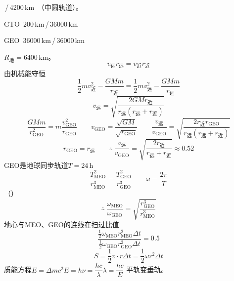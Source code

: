 
\,/\,4200\,km\ （中圆轨道）。

GTO\ 200\,km\,/\,36000\,km

GEO\ 36000\,km\,/\,36000\,km

$R_{\text{地}}=6400\,\mathrm{km}$。
\[
v_{\text{远}}r_{\text{远}}=v_{\text{近}}r_{\text{近}}
\]
由机械能守恒
\[
\frac12mv_{\text{近}}^2-\frac{GMm}{r_{\text{近}}}=\frac12mv_{\text{远}}^2-\frac{GMm}{r_{\text{远}}}
\]
\[
v_{\text{远}}=\sqrt{\frac{2GMr_{\text{近}}}{r_{\text{远}}(r_{\text{远}}+r_{\text{近}})}}
\]
\[
\frac{GMm}{r_{\mathrm{GEO}}^2}=m\frac{v_{\mathrm{GEO}}^2}{r_{\mathrm{GEO}}}\qquad v_{\mathrm{GEO}}=\frac{\sqrt{GM}}{\sqrt{r_{\mathrm{GEO}}}}\qquad \frac{v_{\text{远}}}{v_{\mathrm{GEO}}}=\sqrt{\frac{2r_{\text{近}}r_{\mathrm{GEO}}}{r_{\text{远}}(r_{\text{远}}+r_{\text{近}})}}
\]
\[
r_{\mathrm{GEO}}=r_{\text{远}}\qquad \therefore\ \frac{v_{\text{远}}}{v_{\mathrm{GEO}}}=\sqrt{\frac{2r_{\text{近}}}{r_{\text{远}}+r_{\text{近}}}}\approx0.52
\]
GEO是地球同步轨道\quad $T=24\,\mathrm{h}$
\[
\frac{T_{\mathrm{MEO}}^2}{r_{\mathrm{MEO}}^3}=\frac{T_{\mathrm{GEO}}^2}{r_{\mathrm{GEO}}^3}\qquad \omega=\frac{2\pi}{T}
\]
（） %
\[
\therefore\ \frac{\omega_{\mathrm{MEO}}}{\omega_{\mathrm{GEO}}}=\sqrt{\frac{r_{\mathrm{GEO}}^3}{r_{\mathrm{MEO}}^3}}
\]
地心与MEO、GEO的连线在扫过比值 %
\[
\frac{\frac12\omega_{\mathrm{MEO}}r_{\mathrm{MEO}}^2\Delta t}{\frac12\omega_{\mathrm{GEO}}r_{\mathrm{GEO}}^2\Delta t}=0.5
\]
\[
S=\frac12v\cdot r\Delta t=\frac12\omega r^2\Delta t
\]
质能方程\quad $E=\Delta mc^2$\qquad $E=h\nu=\dfrac{hc}{\lambda}$\qquad $\lambda=\dfrac{hc}{E}$
平轨变垂轨。

